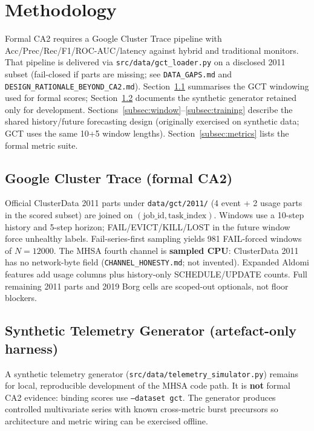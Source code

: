 
\section{Methodology}
\label{sec:Methodology}

Formal CA2 requires a Google Cluster Trace pipeline with Acc/Prec/Rec/F1/ROC-AUC/latency against hybrid and traditional monitors. That pipeline is delivered via \texttt{src/data/gct\_loader.py} on a disclosed 2011 subset (fail-closed if parts are missing; see \texttt{DATA\_GAPS.md} and \texttt{DESIGN\_RATIONALE\_BEYOND\_CA2.md}). Section~\ref{subsec:gct} summarises the GCT windowing used for formal scores; Section~\ref{subsec:synth} documents the synthetic generator retained only for development. Sections~\ref{subsec:window}--\ref{subsec:training} describe the shared history/future forecasting design (originally exercised on synthetic data; GCT uses the same 10+5 window lengths). Section~\ref{subsec:metrics} lists the formal metric suite.

\subsection{Google Cluster Trace (formal CA2)}
\label{subsec:gct}

Official ClusterData 2011 parts under \texttt{data/gct/2011/} (4 event + 2 usage parts in the scored subset) are joined on $(\mathrm{job\_id},\mathrm{task\_index})$. Windows use a 10-step history and 5-step horizon; FAIL/EVICT/KILL/LOST in the future window force unhealthy labels. Fail-series-first sampling yields 981 FAIL-forced windows of $N{=}12000$. The MHSA fourth channel is \textbf{sampled CPU}: ClusterData 2011 has no network-byte field (\texttt{CHANNEL\_HONESTY.md}; not invented). Expanded Aldomi features add usage columns plus history-only SCHEDULE/UPDATE counts. Full remaining 2011 parts and 2019 Borg cells are scoped-out optionals, not floor blockers.

\subsection{Synthetic Telemetry Generator (artefact-only harness)}
\label{subsec:synth}

A synthetic telemetry generator (\texttt{src/data/telemetry\_simulator.py}) remains for local, reproducible development of the MHSA code path. It is \textbf{not} formal CA2 evidence: binding scores use \texttt{--dataset gct}. The generator produces controlled multivariate series with known cross-metric burst precursors so architecture and metric wiring can be exercised offline.

